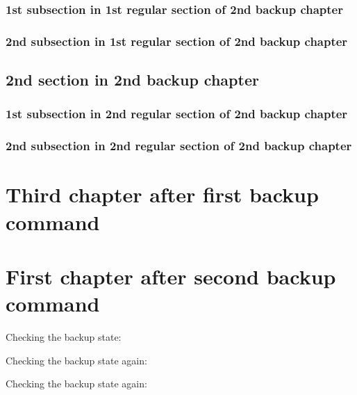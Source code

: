 \documentclass{book}
\begin{document}
\subsection{1st subsection in 1st regular section of 2nd backup chapter}
\subsection{2nd subsection in 1st regular section of 2nd backup chapter}

\section{2nd section in 2nd backup chapter}

\subsection{1st subsection in 2nd regular section of 2nd backup chapter}
\subsection{2nd subsection in 2nd regular section of 2nd backup chapter}


\chapter{Third chapter after first backup command}




\chapter{First chapter after second backup command}


Checking the backup state: 

Checking the backup state again: 

Checking the backup state again: 


\end{document}
